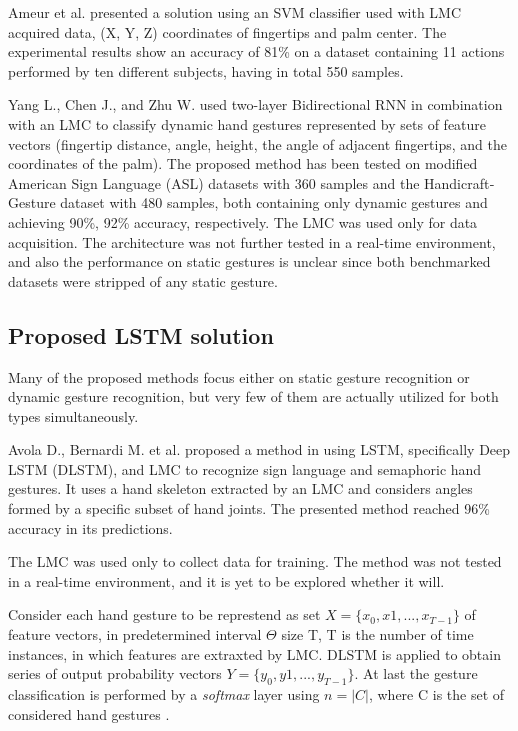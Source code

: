 Ameur et al. \cite{ameur} presented a solution using an SVM classifier used with LMC acquired data, (X, Y, Z) coordinates of fingertips and palm center. The experimental results show an accuracy of 81\% on a dataset containing 11 actions performed by ten different subjects, having in total 550 samples.

Yang L., Chen J., and Zhu W. \cite{bidirect_dynam} used two-layer Bidirectional RNN in combination with an LMC to classify dynamic hand gestures represented by sets of feature vectors (fingertip distance, angle, height, the angle of adjacent fingertips, and the coordinates of the palm). The proposed method has been tested on modified American Sign Language (ASL) datasets with 360 samples and the Handicraft‐Gesture dataset with 480 samples, both containing only dynamic gestures and achieving 90\%, 92\% accuracy, respectively. The LMC was used only for data acquisition. The architecture was not further tested in a real-time environment, and also the performance on static gestures is unclear since both benchmarked datasets were stripped of any static gesture. \cite{bidirect_dynam}

\subsection{Proposed LSTM solution}

Many of the proposed methods focus either on static gesture recognition or dynamic gesture recognition, but very few of them are actually utilized for both types simultaneously. 

Avola D., Bernardi M. et al. proposed a method in \cite{avola} using LSTM, specifically Deep LSTM (DLSTM), and LMC to recognize sign language and semaphoric hand gestures. It uses a hand skeleton extracted by an LMC and considers angles formed by a specific subset of hand joints. The presented method reached 96\% accuracy in its predictions.

The LMC was used only to collect data for training. The method was not tested in a real-time environment, and it is yet to be explored whether it will.

Consider each hand gesture to be represtend as set $X = \{x_0, x1, ..., x_{T-1}\}$ of feature vectors, in predetermined interval $\Theta$ size T, T is the number of time instances, in which features are extraxted by LMC. DLSTM is applied to obtain series of output probability vectors $Y = \{y_0, y1, ..., y_{T-1}\}$. At last the gesture classification is performed by a \textit{softmax} layer using $n = |C|$, where C is the set of considered hand gestures \cite{avola}.

